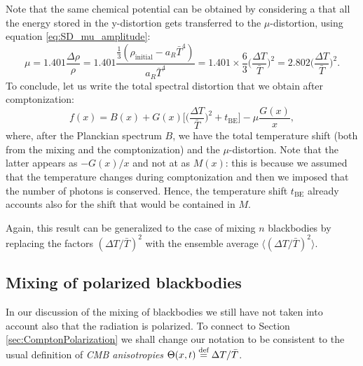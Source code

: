 Note that the same chemical potential can be obtained by considering a that all the energy stored in the y-distortion gets transferred to the $\mu$-distortion, using equation \eqref{eq:SD_mu_amplitude}:$$\mu=1.401\frac{\Delta \rho}{\rho}=1.401\frac{\frac{1}{3}(\rho_\text{initial}-a_R \bar T^4)}{a_R \bar T^4}=1.401\times\frac{6}{3}\bigg(\frac{\Delta T}{\bar T}\bigg)^2=2.802\bigg(\frac{\Delta T}{\bar T}\bigg)^2.$$
To conclude, let us write the total spectral distortion that we obtain after comptonization:
$$f(x)=B(x)+G(x)\bigg[\bigg(\frac{\Delta T}{\bar T}\bigg)^2+t_\text{BE}\bigg]-\mu\frac{G(x)}{x},$$
where, after the Planckian spectrum $B$, we have the total temperature shift (both from the mixing and the comptonization) and the $\mu$-distortion. Note that the latter appears as $-G(x)/x$ and not at as $M(x)$: this is because we assumed that the temperature changes during comptonization and then we imposed that the number of photons is conserved. Hence, the temperature shift $t_\text{BE}$ already accounts also for the shift that would be contained in $M$.

Again, this result can be generalized to the case of mixing $n$ blackbodies by replacing the factors $(\Delta T /\bar T)^2$ with the ensemble average $\langle(\Delta T /\bar T)^2\rangle$.

\subsection{Mixing of polarized blackbodies}
\label{sec:MixingPolarization}
In our discussion of the mixing of blackbodies we still have not taken into account also that the radiation is polarized. To connect to Section \ref{sec:ComptonPolarization} we shall change our notation to be consistent to the usual definition of \emph{CMB anisotropies} $\Theta(x,t)\stackrel{\text{def}}{=} \Delta T/\bar T$.

